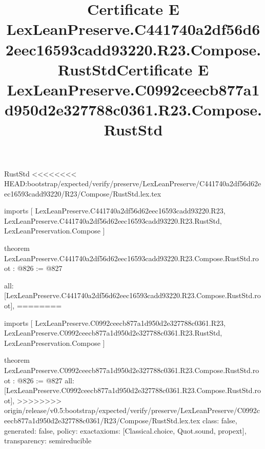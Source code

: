 \begin{lexlean}{RustStd}
<<<<<<<< HEAD:bootstrap/expected/verify/preserve/LexLeanPreserve/C441740a2df56d62eec16593cadd93220/R23/Compose/RustStd.lex.tex
\title{Certificate E LexLeanPreserve.C441740a2df56d62eec16593cadd93220.R23.Compose.RustStd}
\begin{coremodule}
imports [
  LexLeanPreserve.C441740a2df56d62eec16593cadd93220.R23,
  LexLeanPreserve.C441740a2df56d62eec16593cadd93220.R23.RustStd,
  LexLeanPreservation.Compose
]

theorem LexLeanPreserve.C441740a2df56d62eec16593cadd93220.R23.Compose.RustStd.root : @826 := @827 {
  all: [LexLeanPreserve.C441740a2df56d62eec16593cadd93220.R23.Compose.RustStd.root],
========
\title{Certificate E LexLeanPreserve.C0992ceecb877a1d950d2e327788c0361.R23.Compose.RustStd}
\begin{coremodule}
imports [
  LexLeanPreserve.C0992ceecb877a1d950d2e327788c0361.R23,
  LexLeanPreserve.C0992ceecb877a1d950d2e327788c0361.R23.RustStd,
  LexLeanPreservation.Compose
]

theorem LexLeanPreserve.C0992ceecb877a1d950d2e327788c0361.R23.Compose.RustStd.root : @826 := @827 {
  all: [LexLeanPreserve.C0992ceecb877a1d950d2e327788c0361.R23.Compose.RustStd.root],
>>>>>>>> origin/release/v0.5:bootstrap/expected/verify/preserve/LexLeanPreserve/C0992ceecb877a1d950d2e327788c0361/R23/Compose/RustStd.lex.tex
  class: false,
  generated: false,
  policy: exact{axioms: [Classical.choice, Quot.sound, propext]},
  transparency: semireducible
}


\end{coremodule}}
\end{coremodule}
\end{lexlean}
